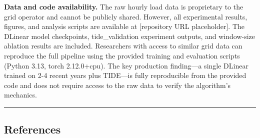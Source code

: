 \textbf{Data and code availability.} The raw hourly load data is
proprietary to the grid operator and cannot be publicly shared. However,
all experimental results, figures, and analysis scripts are available at
{[}repository URL placeholder{]}. The DLinear model checkpoints,
tide\_validation experiment outputs, and window-size ablation results
are included. Researchers with access to similar grid data can reproduce
the full pipeline using the provided training and evaluation scripts
(Python 3.13, torch 2.12.0+cpu). The key production finding---a single
DLinear trained on 2-4 recent years plus TIDE---is fully reproducible
from the provided code and does not require access to the raw data to
verify the algorithm's mechanics.

\begin{center}\rule{0.5\linewidth}{0.5pt}\end{center}

\subsection{References}\label{references}

